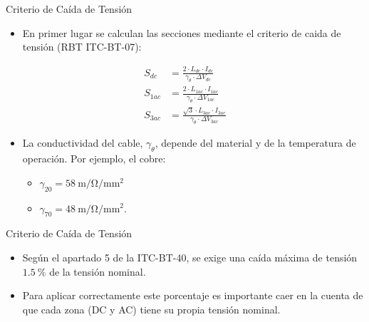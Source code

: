 \documentclass[aspectratio=169, usenames,svgnames,dvipsnames]{beamer}
\begin{document}
\begin{frame}[label={sec:org4ad493d}]{Criterio de Caída de Tensión}
\begin{itemize}
\item En primer lugar se calculan las secciones mediante el criterio de caida de tensión (RBT ITC-BT-07):
\end{itemize}

\begin{align*}
    S_{dc} &=  \frac{2 \cdot L_{dc}\cdot I_{dc}}{\gamma_\theta \cdot \Delta V_{dc}}\\
    S_{1ac} &=  \frac{2\cdot L_{1ac}\cdot I_{1ac}}{\gamma_\theta \cdot \Delta V_{1ac}}\\
    S_{3ac} &= \frac{\sqrt{3} \cdot L_{3ac}\cdot I_{3ac}}{\gamma_\theta \cdot \Delta V_{3ac}}
  \end{align*}

\begin{itemize}
\item La conductividad del cable, \(\gamma_\theta\), depende del material y de la
temperatura de operación. Por ejemplo, el cobre:
\begin{itemize}
\item \(\gamma_{20} = \qty{58}{\meter\per\ohm\per\milli\meter\squared}\)
\item \(\gamma_{70} = \qty{48}{\meter\per\ohm\per\milli\meter\squared}\).
\end{itemize}
\end{itemize}
\end{frame}

\begin{frame}[label={sec:org651b74d}]{Criterio de Caída de Tensión}
\begin{itemize}
\item Según el apartado 5 de la ITC-BT-40, se exige una caída máxima de
tensión \(\SI{1.5}{\percent}\) de la tensión nominal.

\item Para aplicar correctamente este porcentaje es importante caer en la
cuenta de que \alert{cada zona (DC y AC) tiene su propia tensión nominal}.
\end{itemize}
\end{frame}
\end{document}
